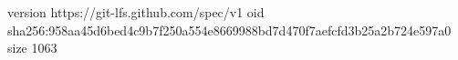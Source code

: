 version https://git-lfs.github.com/spec/v1
oid sha256:958aa45d6bed4c9b7f250a554e8669988bd7d470f7aefcfd3b25a2b724e597a0
size 1063
